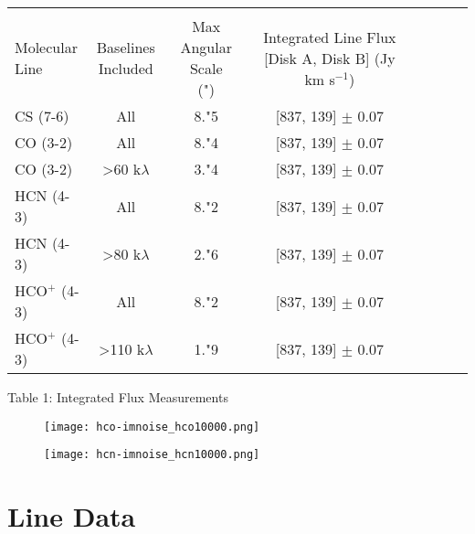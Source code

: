 \begin{tabular}{l*{6}{c}r}
  \hline\hline \\

  \shortstack{Molecular \\ Line} & \shortstack{Baselines \\ Included} & \shortstack{Max Angular Scale \\ (")} & \shortstack{Integrated Line Flux [Disk A, Disk B]\\ (Jy km s$^{-1}$)} \\
  \hline
  CS (7-6)         & All                            & 8."5 & [837, 139] $\pm$ 0.07 \\
  CO (3-2)         & All                            & 8."4 & [837, 139] $\pm$ 0.07 \\
  CO (3-2)         & \textgreater 60 k$\lambda$     & 3."4 & [837, 139] $\pm$ 0.07 \\
  HCN (4-3)        & All                            & 8."2 & [837, 139] $\pm$ 0.07 \\
  HCN (4-3)        & \textgreater 80 k$\lambda$     & 2."6 & [837, 139] $\pm$ 0.07 \\
  HCO$^{+}$ (4-3)  & All                            & 8."2 & [837, 139] $\pm$ 0.07 \\
  HCO$^{+}$ (4-3)  & \textgreater 110 k$\lambda$    & 1."9 & [837, 139] $\pm$ 0.07 \\
  \hline
\end{tabular}
\caption{Table 1: Integrated Flux Measurements}
\bigskip
\bigskip


\begin{figure}
\centering
\begin{minipage}{.48\textwidth}
  \centering
  \texttt{[image: hco-imnoise\_hco10000.png]}
  \label{fig:test1}
\end{minipage}%
\begin{minipage}{.48\textwidth}
  \centering
  \texttt{[image: hcn-imnoise\_hcn10000.png]}
  \label{fig:test2}
\end{minipage}
\end{figure}


\section{Line Data}

